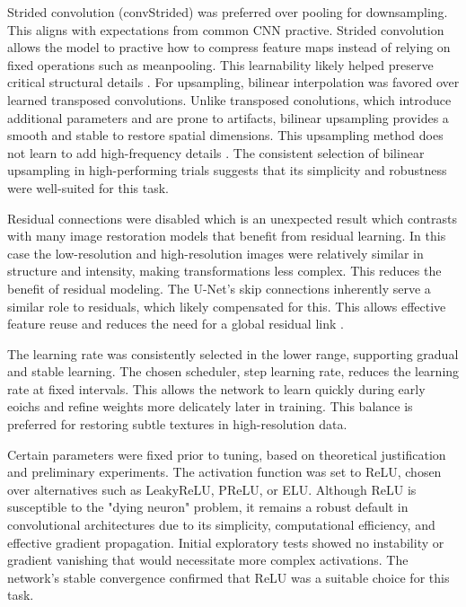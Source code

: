 \documentclass[twocolumn]{article}
\begin{document}
Strided convolution (convStrided) was preferred over pooling for downsampling. 
This aligns with expectations from common CNN practive. 
Strided convolution allows the model to practive how to compress feature maps instead of relying on fixed operations such as meanpooling. 
This learnability likely helped preserve critical structural details \cite{springenberg2014}.
For upsampling, bilinear interpolation was favored over learned transposed convolutions. 
Unlike transposed conolutions, which introduce additional parameters and are prone to artifacts, bilinear upsampling provides a smooth and stable to restore spatial dimensions. 
This upsampling method does not learn to add high-frequency details \cite{kolarik2019}.
The consistent selection of bilinear upsampling in high-performing trials suggests that its simplicity and robustness were well-suited for this task.
 
Residual connections were disabled which is an unexpected result which contrasts with many image restoration models that benefit from residual learning. 
In this case the low-resolution and high-resolution images were relatively similar in structure and intensity, making transformations less complex.
This reduces the benefit of residual modeling. 
The U-Net's skip connections inherently serve a similar role to residuals, which likely compensated for this. 
This allows effective feature reuse and reduces the need for a global residual link \cite{xu2024}.

The learning rate was consistently selected in the lower range, supporting gradual and stable learning. 
The chosen scheduler, step learning rate, reduces the learning rate at fixed intervals. 
This allows the network to learn quickly during early eoichs and refine weights more delicately later in training. 
This balance is preferred for restoring subtle textures in high-resolution data. 

Certain parameters were fixed prior to tuning, based on theoretical justification and preliminary experiments. 
The activation function was set to ReLU, chosen over alternatives such as LeakyReLU, PReLU, or ELU. 
Although ReLU is susceptible to the "dying neuron" problem, it remains a robust default in convolutional architectures due to its simplicity, computational efficiency, and effective gradient propagation. 
Initial exploratory tests showed no instability or gradient vanishing that would necessitate more complex activations. 
The network’s stable convergence confirmed that ReLU was a suitable choice for this task.
\end{document}
